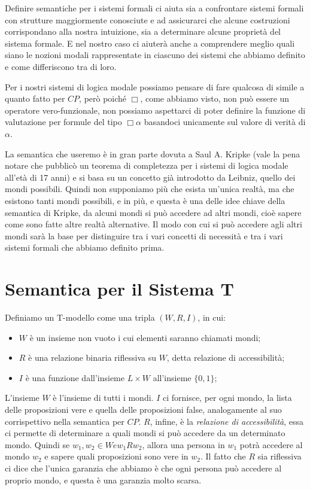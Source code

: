 \documentclass[a4paper, titlepage, 12pt]{report}
\begin{document}
Definire semantiche per i sistemi formali ci aiuta sia a confrontare sistemi formali
con strutture maggiormente conosciute e ad assicurarci
che alcune costruzioni corrispondano alla nostra intuizione,
sia a determinare alcune proprietà del sistema formale. E nel nostro caso ci aiuterà anche
a comprendere meglio quali siano le nozioni modali rappresentate in ciascuno dei sistemi
che abbiamo definito e come differiscono tra di loro.

Per i nostri sistemi di logica modale possiamo pensare di fare qualcosa di simile
a quanto fatto per $CP$, però poiché $\Box$, come abbiamo visto, non può essere
un operatore vero-funzionale, non possiamo aspettarci di poter definire la
funzione di valutazione per formule
del tipo $\Box \alpha$ basandoci unicamente sul valore di verità di $\alpha$.

La semantica che useremo è in gran parte dovuta a Saul A. Kripke (vale la pena notare
che pubblicò un teorema di completezza per i sistemi di logica modale all'età di 17 anni)
e si basa su un concetto già introdotto da Leibniz, quello dei mondi possibili.
Quindi non supponiamo più che esista un'unica realtà, ma che esistono tanti mondi possibili,
e in più, e questa è una delle idee chiave della semantica di Kripke, da alcuni mondi
si può accedere ad altri mondi, cioè sapere come sono fatte altre realtà alternative.
Il modo con cui si può accedere agli altri mondi sarà la base per distinguire
tra i vari concetti di necessità e tra i vari sistemi formali che abbiamo definito prima.

\section{Semantica per il Sistema T}
Definiamo un T-modello come una tripla $(W, R, I)$, in cui:
\begin{itemize}
\item $W$ è un insieme non vuoto i cui elementi saranno chiamati mondi;
\item $R$ è una relazione binaria riflessiva su $W$, detta relazione di accessibilità;
\item $I$ è una funzione dall'insieme $L \times W$ all'insieme $\{0, 1\}$;
\end{itemize}

L'insieme $W$ è l'insieme di tutti i mondi.
$I$ ci fornisce, per ogni mondo, la lista delle proposizioni vere
e quella delle proposizioni false, analogamente al suo corrispettivo nella semantica per $CP$.
$R$, infine, è la \textit{relazione di accessibilità},
essa ci permette di determinare a quali mondi si può accedere da un determinato mondo.
Quindi se $w_1, w_2 \in W e w_1 R w_2$, allora una persona in $w_1$ potrà accedere
al mondo $w_2$ e sapere quali proposizioni sono vere in $w_2$.
Il fatto che $R$ sia riflessiva ci dice che l'unica garanzia che abbiamo
è che ogni persona può accedere al proprio mondo, e questa è una garanzia molto scarsa.
\end{document}
